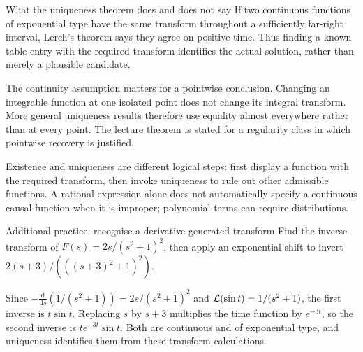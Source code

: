 \begin{concept}{What the uniqueness theorem does and does not say}
If two continuous functions of exponential type have the same transform throughout a sufficiently far-right interval, Lerch's theorem says they agree on positive time. Thus finding a known table entry with the required transform identifies the actual solution, rather than merely a plausible candidate.

The continuity assumption matters for a pointwise conclusion. Changing an integrable function at one isolated point does not change its integral transform. More general uniqueness results therefore use equality almost everywhere rather than at every point. The lecture theorem is stated for a regularity class in which pointwise recovery is justified.

Existence and uniqueness are different logical steps: first display a function with the required transform, then invoke uniqueness to rule out other admissible functions. A rational expression alone does not automatically specify a continuous causal function when it is improper; polynomial terms can require distributions.
\end{concept}
\begin{question}{Additional practice: recognise a derivative-generated transform}
Find the inverse transform of $F(s)=2s/(s^2+1)^2$, then apply an exponential shift to invert $2(s+3)/(((s+3)^2+1)^2)$.
\end{question}
\begin{answer}
Since $-\frac{\mathrm d}{\mathrm ds}(1/(s^2+1))=2s/(s^2+1)^2$ and $\mathcal L(\sin t)=1/(s^2+1)$, the first inverse is $t\sin t$. Replacing $s$ by $s+3$ multiplies the time function by $e^{-3t}$, so the second inverse is $te^{-3t}\sin t$. Both are continuous and of exponential type, and uniqueness identifies them from these transform calculations.
\end{answer}

